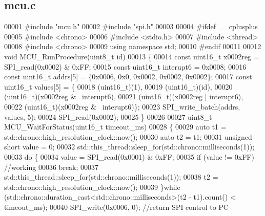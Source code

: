 \subsection{mcu.\+c}
\label{mcu_8c_source}

\begin{DoxyCode}
00001 \textcolor{preprocessor}{#include "mcu.h"}
00002 \textcolor{preprocessor}{#include "spi.h"}
00003 
00004 \textcolor{preprocessor}{#ifdef \_\_cplusplus}
00005 \textcolor{preprocessor}{    #include <chrono>}
00006 \textcolor{preprocessor}{    #include <stdio.h>}
00007 \textcolor{preprocessor}{    #include <thread>}
00008 \textcolor{preprocessor}{    #include <chrono>}
00009 \textcolor{keyword}{using namespace }std;
00010 \textcolor{preprocessor}{#endif}
00011 
00012 \textcolor{keywordtype}{void} MCU_RunProcedure(uint8\_t \textcolor{keywordtype}{id})
00013 \{
00014     \textcolor{keyword}{const} uint16\_t x0002reg = SPI_read(0x0002) & 0xFF;
00015     \textcolor{keyword}{const} uint16\_t interupt6 = 0x0008;
00016     \textcolor{keyword}{const} uint16\_t addrs[5] = \{0x0006, 0x0, 0x0002, 0x0002, 0x0002\};
00017     \textcolor{keyword}{const} uint16\_t values[5] = \{
00018         (uint16\_t)(1),
00019         (uint16\_t)(\textcolor{keywordtype}{id}),
00020         (uint16\_t)(x0002reg & ~interupt6),
00021         (uint16\_t)(x0002reg | interupt6),
00022         (uint16\_t)(x0002reg & ~interupt6)\};
00023     SPI_write_batch(addrs, values, 5);
00024     SPI_read(0x0002);
00025 \}
00026 
00027 uint8\_t MCU_WaitForStatus(uint16\_t timeout_ms)
00028 \{
00029     \textcolor{keyword}{auto} t1 = std::chrono::high\_resolution\_clock::now();
00030     \textcolor{keyword}{auto} t2 = t1;
00031     \textcolor{keywordtype}{unsigned} \textcolor{keywordtype}{short} value = 0;
00032     std::this\_thread::sleep\_for(std::chrono::milliseconds(1));
00033     \textcolor{keywordflow}{do} \{
00034         value = SPI_read(0x0001) & 0xFF;
00035         \textcolor{keywordflow}{if} (value != 0xFF) \textcolor{comment}{//working}
00036             \textcolor{keywordflow}{break};
00037         std::this\_thread::sleep\_for(std::chrono::milliseconds(1));
00038         t2 = std::chrono::high\_resolution\_clock::now();
00039     \}\textcolor{keywordflow}{while} (std::chrono::duration\_cast<std::chrono::milliseconds>(t2 - t1).count() < timeout\_ms);
00040     SPI_write(0x0006, 0); \textcolor{comment}{//return SPI control to PC}

\end{DoxyCode}
